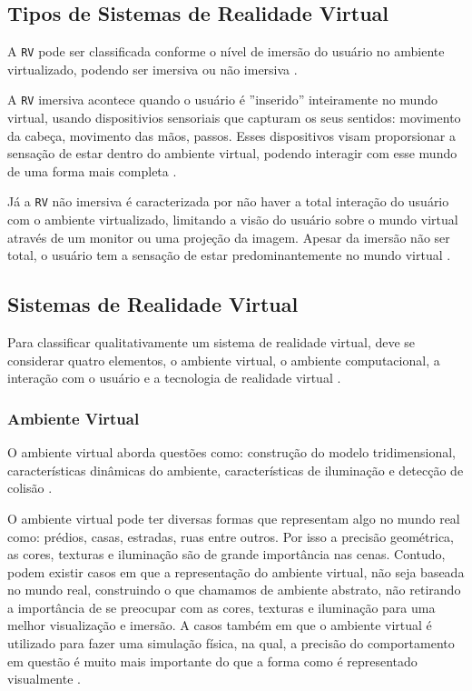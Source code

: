 \subsection {Tipos de Sistemas de Realidade Virtual}
A \verb'RV' pode ser classificada conforme o nível de imersão do usuário no ambiente virtualizado, podendo ser imersiva ou não imersiva \cite{kirner2006}.

A  \verb'RV' imersiva acontece quando o usuário é ''inserido'' inteiramente no mundo virtual, usando dispositivios sensoriais que capturam os seus sentidos: movimento da cabeça, movimento das mãos, passos. Esses dispositivos visam proporsionar a sensação de estar dentro do ambiente virtual, podendo interagir com esse mundo de uma forma mais completa \cite{kirner2006}.

Já a \verb'RV' não imersiva é caracterizada por não haver a total interação do usuário com o ambiente virtualizado, limitando a visão do usuário sobre o mundo virtual através de um monitor ou uma projeção da imagem. Apesar da imersão não ser total, o usuário tem a sensação de estar predominantemente no mundo virtual \cite{kirner2006}.


\subsection{Sistemas de Realidade Virtual}
Para classificar qualitativamente um sistema de realidade virtual, deve se considerar quatro elementos, o ambiente virtual, o ambiente computacional, a interação com o usuário e a tecnologia de realidade virtual \cite{kirner2006}.

\subsubsection{Ambiente Virtual}
O ambiente virtual aborda questões como: construção do modelo tridimensional, características dinâmicas do ambiente, características de iluminação e detecção de colisão \cite{kirner2006}.

O ambiente virtual pode ter diversas formas que representam algo no mundo real como: prédios, casas, estradas, ruas entre outros. Por isso a precisão geométrica, as cores, texturas e iluminação são de grande importância nas cenas. Contudo, podem existir casos em que a representação do ambiente virtual, não seja baseada no mundo real, construindo o que chamamos de ambiente abstrato, não retirando a importância de se preocupar com as cores, texturas e iluminação para uma melhor visualização e imersão. A casos também em que o ambiente virtual é utilizado para fazer uma simulação física, na qual, a precisão do comportamento em questão é muito mais importante do que a forma como é representado visualmente \cite{kirner2006}.

